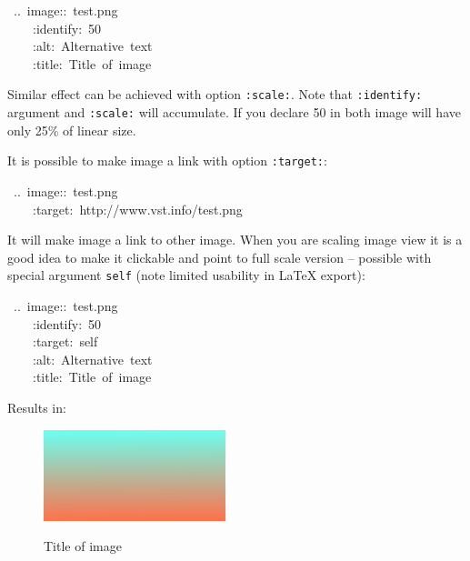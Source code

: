 \documentclass[12pt]{article}
\begin{document}
\begin{ttfamily}\begin{flushleft}
\mbox{~..~image::~test.png}\\
\mbox{~~~~:identify:~50}\\
\mbox{~~~~:alt:~Alternative~text}\\
\mbox{~~~~:title:~Title~of~image}\\
\end{flushleft}\end{ttfamily}

Similar effect can be achieved with option \texttt{:scale:}. Note that
\texttt{:identify:} argument and \texttt{:scale:} will accumulate. If you declare 50 in
both image will have only 25\% of linear size.

It is possible to make image a link with option \texttt{:target:}:

\begin{ttfamily}\begin{flushleft}
\mbox{~..~image::~test.png}\\
\mbox{~~~~:target:~http://www.vst.info/test.png}\\
\end{flushleft}\end{ttfamily}

It will make image a link to other image. When you are scaling image
view it is a good idea to make it clickable and point to full scale
version -- possible with special argument \texttt{self} (note limited
usability in \LaTeX{} export):

\begin{ttfamily}\begin{flushleft}
\mbox{~..~image::~test.png}\\
\mbox{~~~~:identify:~50}\\
\mbox{~~~~:target:~self}\\
\mbox{~~~~:alt:~Alternative~text}\\
\mbox{~~~~:title:~Title~of~image}\\
\end{flushleft}\end{ttfamily}

Results in:

\begin{figure}[ht]\centering\href{test.png}{\includegraphics{test.png}}\caption{Title of image}\end{figure}
\hypertarget{lfigures}{}
\end{document}
